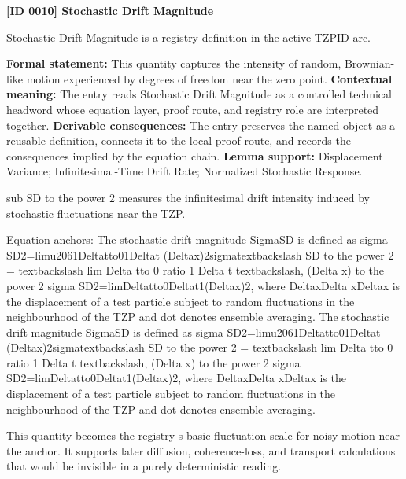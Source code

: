 \clearpage
\noindent\textbf{[ID 0010] Stochastic Drift Magnitude}\par
\vspace{0.35em}
\begingroup\small
{}
Stochastic Drift Magnitude is a registry definition in the active TZPID arc.

\begingroup\footnotesize\setlength{\emergencystretch}{3em}\sloppy
\textbf{Formal statement:} This quantity captures the intensity of random, Brownian-like motion experienced by degrees of freedom near the zero point. \textbf{Contextual meaning:} The entry reads Stochastic Drift Magnitude as a controlled technical headword whose equation layer, proof route, and registry role are interpreted together. \textbf{Derivable consequences:} The entry preserves the named object as a reusable definition, connects it to the local proof route, and records the consequences implied by the equation chain. \textbf{Lemma support:} Displacement Variance; Infinitesimal-Time Drift Rate; Normalized Stochastic Response.\par
\endgroup

sub SD to the power 2 measures the infinitesimal drift intensity induced by stochastic fluctuations near the TZP.

Equation anchors: The stochastic drift magnitude SigmaSD is defined as sigma SD2=limu2061Deltatto01Deltat (Deltax)2sigmatextbackslash SD to the power 2 = textbackslash lim Delta tto 0 ratio 1 Delta t textbackslash, (Delta x) to the power 2 sigma SD2=limDeltatto0Deltat1(Deltax)2, where DeltaxDelta xDeltax is the displacement of a test particle subject to random fluctuations in the neighbourhood of the TZP and  dot  denotes ensemble averaging. The stochastic drift magnitude SigmaSD is defined as sigma SD2=limu2061Deltatto01Deltat (Deltax)2sigmatextbackslash SD to the power 2 = textbackslash lim Delta tto 0 ratio 1 Delta t textbackslash, (Delta x) to the power 2 sigma SD2=limDeltatto0Deltat1(Deltax)2, where DeltaxDelta xDeltax is the displacement of a test particle subject to random fluctuations in the neighbourhood of the TZP and  dot  denotes ensemble averaging.

This quantity becomes the registry s basic fluctuation scale for noisy motion near the anchor. It supports later diffusion, coherence-loss, and transport calculations that would be invisible in a purely deterministic reading.
\endgroup


